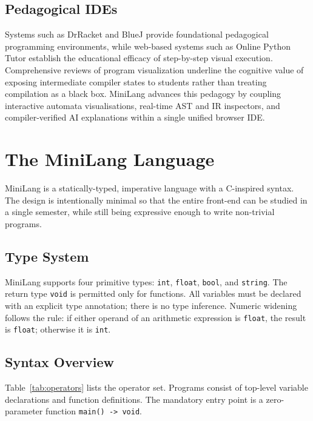 \documentclass[conference]{IEEEtran}
\begin{document}
\subsection{Pedagogical IDEs}

Systems such as DrRacket \cite{drracket} and BlueJ \cite{bluej} provide
foundational pedagogical programming environments, while web-based
systems such as Online Python Tutor \cite{pythontutor} establish the
educational efficacy of step-by-step visual execution. Comprehensive
reviews of program visualization \cite{sorva2013} underline the
cognitive value of exposing intermediate compiler states to students
rather than treating compilation as a black box. MiniLang advances this
pedagogy by coupling interactive automata visualisations, real-time AST
and IR inspectors, and compiler-verified AI explanations within a single
unified browser IDE.

\section{The MiniLang Language}
\label{sec:language}

MiniLang is a statically-typed, imperative language with a C-inspired
syntax. The design is intentionally minimal so that the entire
front-end can be studied in a single semester, while still being
expressive enough to write non-trivial programs.

\subsection{Type System}

MiniLang supports four primitive types: \texttt{int}, \texttt{float},
\texttt{bool}, and \texttt{string}. The return type \texttt{void} is
permitted only for functions. All variables must be declared with an
explicit type annotation; there is no type inference. Numeric widening
follows the rule: if either operand of an arithmetic expression is
\texttt{float}, the result is \texttt{float}; otherwise it is
\texttt{int}.

\subsection{Syntax Overview}

Table~\ref{tab:operators} lists the operator set. Programs consist of
top-level variable declarations and function definitions. The mandatory
entry point is a zero-parameter function \texttt{main() -> void}.
\end{document}
